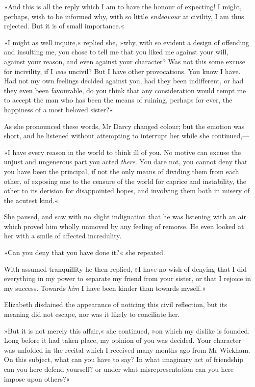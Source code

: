 »And this is all the reply which I am to have the honour of expecting! I might, perhaps, wish to be informed why, with so little \textit{endeavour} at civility, I am thus rejected. But it is of small importance.«

»I might as well inquire,« replied she, »why, with so evident a design of offending and insulting me, you chose to tell me that you liked me against your will, against your reason, and even against your character? Was not this some excuse for incivility, if I \textit{was} uncivil? But I have other provocations. You know I have. Had not my own feelings decided against you, had they been indifferent, or had they even been favourable, do you think that any consideration would tempt me to accept the man who has been the means of ruining, perhaps for ever, the happiness of a most beloved sister?«

As she pronounced these words, Mr Darcy changed colour; but the emotion was short, and he listened without attempting to interrupt her while she continued,—

»I have every reason in the world to think ill of you. No motive can excuse the unjust and ungenerous part you acted \textit{there}. You dare not, you cannot deny that you have been the principal, if not the only means of dividing them from each other, of exposing one to the censure of the world for caprice and instability, the other to its derision for disappointed hopes, and involving them both in misery of the acutest kind.«

She paused, and saw with no slight indignation that he was listening with an air which proved him wholly unmoved by any feeling of remorse. He even looked at her with a smile of affected incredulity.

»Can you deny that you have done it?« she repeated.

With assumed tranquillity he then replied, »I have no wish of denying that I did everything in my power to separate my friend from your sister, or that I rejoice in my success. Towards \textit{him} I have been kinder than towards myself.«

Elizabeth disdained the appearance of noticing this civil reflection, but its meaning did not escape, nor was it likely to conciliate her.

»But it is not merely this affair,« she continued, »on which my dislike is founded. Long before it had taken place, my opinion of you was decided. Your character was unfolded in the recital which I received many months ago from Mr Wickham. On this subject, what can you have to say? In what imaginary act of friendship can you here defend yourself? or under what misrepresentation can you here impose upon others?«


